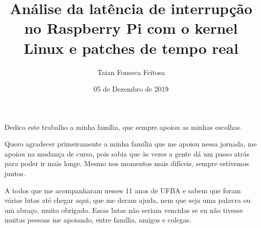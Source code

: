 \documentclass[bsc, classic, a4paper, twoside]{ufbathesis}
\institute{Departamento de Engenharia Elétrica e de Computação}
\title{Análise da latência de interrupção no Raspberry Pi com o kernel Linux e patches de tempo real}
\date{05 de Dezembro de 2019}
\author{Taian Fonseca Feitosa}
\begin{document}
\pgcompfrontpage{}

\frontmatter


\catalogingsheet


\begin{dedicatory}
Dedico este trabalho a minha família, que sempre apoiou as minhas escolhas.
\end{dedicatory}

\acknowledgements

Quero agradecer primeiramente a minha família que me apoiou nessa jornada, me apoiou na mudança de curso, pois sabia que às vezes a gente dá um passo atrás para poder ir mais longe. Mesmo nos momentos mais difíceis, sempre estivemos juntos.

A todos que me acompanharam nesses 11 anos de UFBA e sabem que foram várias lutas até chegar aqui, que me deram ajuda, nem que seja uma palavra ou um abraço, muito obrigado. Essas lutas não seriam vencidas se eu não tivesse muitas pessoas me apoiando, entre família, amigos e colegas.
\end{document}
